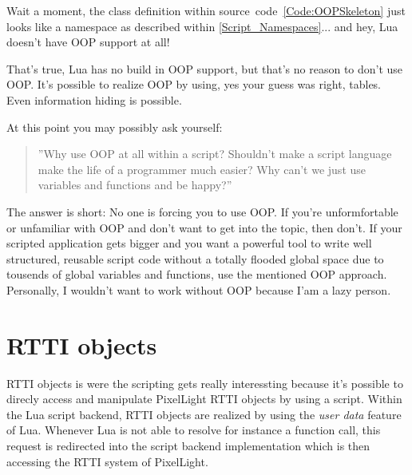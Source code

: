 Wait a moment, the class definition within source~code~\ref{Code:OOPSkeleton} just looks like a namespace as described within \ref{Script_Namespaces}... and hey, Lua doesn't have OOP support at all!

That's true, Lua has no build in OOP support, but that's no reason to don't use OOP. It's possible to realize OOP by using, yes your guess was right, tables. Even information hiding is possible.

At this point you may possibly ask yourself: \begin{quote}''Why use OOP at all within a script? Shouldn't make a script language make the life of a programmer much easier? Why can't we just use variables and functions and be happy?''\end{quote} The answer is short: No one is forcing you to use OOP. If you're unformfortable or unfamiliar with OOP and don't want to get into the topic, then don't. If your scripted application gets bigger and you want a powerful tool to write well structured, reusable script code without a totally flooded global space due to tousends of global variables and functions, use the mentioned OOP approach. Personally, I wouldn't want to work without OOP because I'am a lazy person.




\section{RTTI objects}
\label{Script_RTTIObjects}
RTTI objects is were the scripting gets really interessting because it's possible to direcly access and manipulate PixelLight RTTI objects by using a script. Within the Lua script backend, RTTI objects are realized by using the \emph{user data} feature of Lua. Whenever Lua is not able to resolve for instance a function call, this request is redirected into the script backend implementation which is then accessing the RTTI system of PixelLight.

